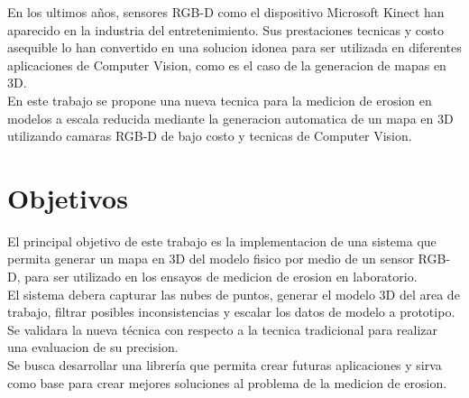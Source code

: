
En los ultimos a\~{n}os, sensores RGB-D como el dispositivo Microsoft Kinect han aparecido en la industria del entretenimiento. Sus prestaciones tecnicas y costo asequible lo han convertido en una solucion idonea para ser utilizada en diferentes aplicaciones de Computer Vision, como es el caso de la generacion de mapas en 3D. \\

En este trabajo se propone una nueva tecnica para la medicion de erosion en modelos a escala reducida mediante la generacion automatica de un mapa en 3D utilizando camaras RGB-D de bajo costo y tecnicas de Computer Vision.
 

\section{Objetivos}
\label{S:objetivos}

El principal objetivo de este trabajo es la implementacion de una sistema que permita generar un mapa en 3D del modelo fisico por medio de un sensor RGB-D, para ser utilizado en los ensayos de medicion de erosion en laboratorio. \\
El sistema debera capturar las nubes de puntos, generar el modelo 3D del area de trabajo, filtrar posibles inconsistencias y escalar los datos de modelo a prototipo. \\
Se validara la nueva t\'{e}cnica con respecto a la tecnica tradicional para realizar una evaluacion de su precision. \\
Se busca desarrollar una librer\'{i}a que permita crear futuras aplicaciones y sirva como base para crear mejores soluciones al problema de la medicion de erosion.

